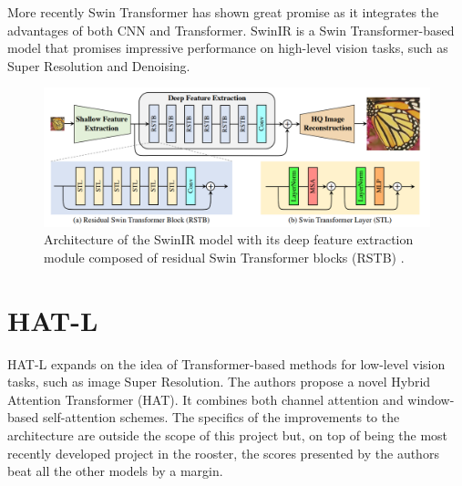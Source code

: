 More recently Swin Transformer \cite{liu2021swin}  has shown great promise as it integrates the advantages of both CNN and
Transformer. SwinIR \cite{liang2021swinir} is a Swin Transformer-based model that promises impressive performance on high-level vision tasks, such as Super Resolution and Denoising.

\begin{figure}[H]
  \centering
  \includegraphics[scale=0.35]{figures/SwinIR.png}
  \caption{Architecture of the SwinIR model with its deep feature extraction module composed of residual Swin Transformer blocks (RSTB) \cite{liang2021swinir}.}
  \label{img:swinir}
\end{figure}

\section{HAT-L}
\label{subsec:hatl}

HAT-L expands on the idea of Transformer-based methods for low-level vision tasks, such as image Super Resolution. The authors propose a novel Hybrid Attention Transformer (HAT). It combines both channel attention and window-based self-attention schemes. The specifics of the improvements to the architecture are outside the scope of this project but, on top of being the most recently developed project in the rooster, the scores presented by the authors beat all the other models by a margin.


